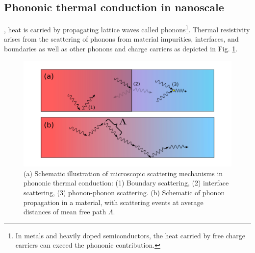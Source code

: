 
\subsection{Phononic thermal conduction in nanoscale}
\label{sec:intro_vib}



, heat is carried by propagating lattice waves called phonons\footnote{In metals and heavily doped semiconductors, the heat carried by free charge carriers can exceed the phononic contribution.}. Thermal resistivity arises from the scattering of phonons from material impurities, interfaces, and boundaries as well as other phonons and charge carriers \cite{peierls29,ziman} as depicted in Fig. \ref{fig:intro_scattering}. %

\begin{figure}
\begin{center}
 \includegraphics[width=.99\columnwidth]{inkscape/scattering.pdf}
 \caption{(a) Schematic illustration of microscopic scattering mechanisms in phononic thermal conduction: (1) Boundary scattering, (2) interface scattering, (3) phonon-phonon scattering. (b) Schematic of phonon propagation in a material, with scattering events at average distances of mean free path $\Lambda$.}
\label{fig:intro_scattering}
\end{center}
\end{figure}

